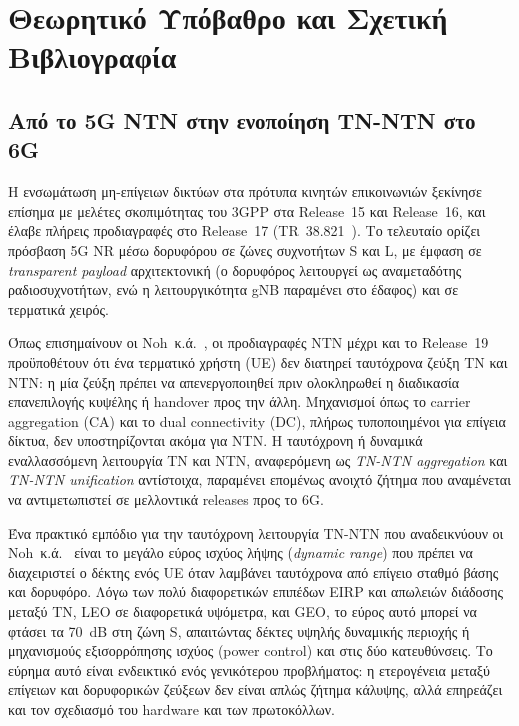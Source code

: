 \chapter{Θεωρητικό Υπόβαθρο και Σχετική Βιβλιογραφία}
\label{ch:background}

\section{Από το 5G NTN στην ενοποίηση TN-NTN στο 6G}
\label{sec:bg-3gpp-evolution}

Η ενσωμάτωση μη-επίγειων δικτύων στα πρότυπα κινητών επικοινωνιών ξεκίνησε
επίσημα με μελέτες σκοπιμότητας του 3GPP στα Release~15 και Release~16, και
έλαβε πλήρεις προδιαγραφές στο Release~17 (TR~38.821~\cite{tr38821}). Το
τελευταίο ορίζει πρόσβαση 5G NR μέσω δορυφόρου σε ζώνες συχνοτήτων S και
L, με έμφαση σε \emph{transparent payload} αρχιτεκτονική (ο δορυφόρος
λειτουργεί ως αναμεταδότης ραδιοσυχνοτήτων, ενώ η λειτουργικότητα gNB
παραμένει στο έδαφος) και σε τερματικά χειρός.

Όπως επισημαίνουν οι Noh~κ.ά.~\cite{noh2024tnntn}, οι προδιαγραφές NTN
μέχρι και το Release~19 προϋποθέτουν ότι ένα τερματικό χρήστη (UE) δεν
διατηρεί ταυτόχρονα ζεύξη TN και NTN: η μία ζεύξη πρέπει να
απενεργοποιηθεί πριν ολοκληρωθεί η διαδικασία επανεπιλογής κυψέλης ή
handover προς την άλλη. Μηχανισμοί όπως το carrier aggregation (CA) και
το dual connectivity (DC), πλήρως τυποποιημένοι για επίγεια δίκτυα, δεν
υποστηρίζονται ακόμα για NTN. Η ταυτόχρονη ή δυναμικά εναλλασσόμενη
λειτουργία TN και NTN, αναφερόμενη ως \emph{TN-NTN aggregation} και
\emph{TN-NTN unification} αντίστοιχα, παραμένει επομένως ανοιχτό ζήτημα
που αναμένεται να αντιμετωπιστεί σε μελλοντικά releases προς το 6G.

Ένα πρακτικό εμπόδιο για την ταυτόχρονη λειτουργία TN-NTN που αναδεικνύουν
οι Noh~κ.ά.~\cite{noh2024tnntn} είναι το μεγάλο εύρος ισχύος λήψης
(\emph{dynamic range}) που πρέπει να διαχειριστεί ο δέκτης ενός UE όταν
λαμβάνει ταυτόχρονα από επίγειο σταθμό βάσης και δορυφόρο. Λόγω των πολύ
διαφορετικών επιπέδων EIRP και απωλειών διάδοσης μεταξύ TN, LEO σε
διαφορετικά υψόμετρα, και GEO, το εύρος αυτό μπορεί να φτάσει τα 70~dB στη
ζώνη S, απαιτώντας δέκτες υψηλής δυναμικής περιοχής ή μηχανισμούς
εξισορρόπησης ισχύος (power control) και στις δύο κατευθύνσεις. Το εύρημα
αυτό είναι ενδεικτικό ενός γενικότερου προβλήματος: η ετερογένεια μεταξύ
επίγειων και δορυφορικών ζεύξεων δεν είναι απλώς ζήτημα κάλυψης, αλλά
επηρεάζει και τον σχεδιασμό του hardware και των πρωτοκόλλων.

